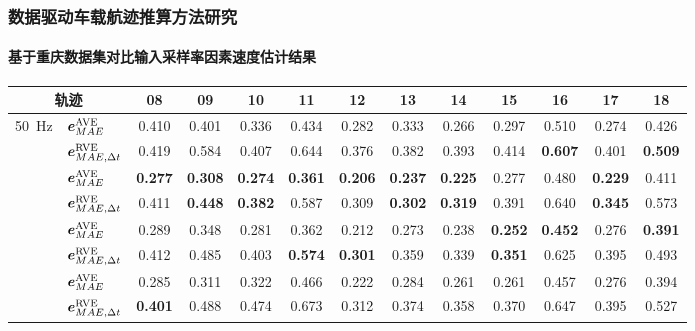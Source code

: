 \begin{frame} 
 	\frametitle{数据驱动车载航迹推算方法研究}
 	\framesubtitle{基于重庆数据集对比输入采样率因素速度估计结果}
    {\footnotesize
    \setlength{\tabcolsep}{2pt}
		\begin{tabular*}{\linewidth}{@{\extracolsep{\fill}}clccccccccccc}
			\toprule
			\multicolumn{2}{c}{轨迹} & 08 & 09 & 10 & 11 & 12 & 13 & 14 & 15 & 16 & 17 & 18 \\
			\midrule
			\multirow{2}{*}{\SI{50}{Hz}} 
			& $\vb*{e}^{\mathrm{AVE}}_{MAE}$ 
			& 0.410 & 0.401 & 0.336 & 0.434 & 0.282 & 0.333 & 0.266 & 0.297 & 0.510 & 0.274 & 0.426 \\
			& $\vb*{e}^{\mathrm{RVE}}_{MAE, \Delta t}$ 
			& 0.419 & 0.584 & 0.407 & 0.644 & 0.376 & 0.382 & 0.393 & 0.414 & \textbf{0.607} & 0.401 & \textbf{0.509} \\ \addlinespace[1mm]
			\multirow{2}{*}{\SI{100}{Hz}} 
			& $\vb*{e}^{\mathrm{AVE}}_{MAE}$ 
			& \textbf{0.277} & \textbf{0.308} & \textbf{0.274} & \textbf{0.361} & \textbf{0.206} & \textbf{0.237} & \textbf{0.225} & 0.277 & 0.480 & \textbf{0.229} & 0.411 \\ 
			& $\vb*{e}^{\mathrm{RVE}}_{MAE, \Delta t}$ 
			& 0.411 & \textbf{0.448} & \textbf{0.382} & 0.587 & 0.309 & \textbf{0.302} & \textbf{0.319} & 0.391 & 0.640 & \textbf{0.345} & 0.573 \\ \addlinespace[1mm]
			\multirow{2}{*}{\SI{150}{Hz}} 
			& $\vb*{e}^{\mathrm{AVE}}_{MAE}$ 
			& 0.289 & 0.348 & 0.281 & 0.362 & 0.212 & 0.273 & 0.238 & \textbf{0.252} & \textbf{0.452} & 0.276 & \textbf{0.391} \\
			& $\vb*{e}^{\mathrm{RVE}}_{MAE, \Delta t}$ 
			& 0.412 & 0.485 & 0.403 & \textbf{0.574} & \textbf{0.301} & 0.359 & 0.339 & \textbf{0.351} & 0.625 & 0.395 & 0.493 \\ \addlinespace[1mm]
			\multirow{2}{*}{\SI{200}{Hz}} 
			& $\vb*{e}^{\mathrm{AVE}}_{MAE}$ 
			& 0.285 & 0.311 & 0.322 & 0.466 & 0.222 & 0.284 & 0.261 & 0.261 & 0.457 & 0.276 & 0.394 \\         
			& $\vb*{e}^{\mathrm{RVE}}_{MAE, \Delta t}$ 
			& \textbf{0.401} & 0.488 & 0.474 & 0.673 & 0.312 & 0.374 & 0.358 & 0.370 & 0.647 & 0.395 & 0.527 \\
			\bottomrule 
		\end{tabular*}
	}	
\end{frame}

